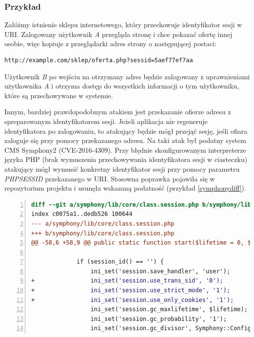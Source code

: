 \documentclass[11pt,a4paper,polish,thesis,oneside]{dcsbook}
\begin{document}
\subsubsection*{Przykład}
Załóżmy istnienie sklepu internetowego, który przechowuje identyfikator sesji w URI. Zalogowany użytkownik \textit{A} przegląda stronę i chce pokazać ofertę innej osobie, więc kopiuje z przeglądarki adres strony o następującej postaci:
\begin{lstlisting}
http://example.com/sklep/oferta.php?sessid=5aef77ef7aa
\end{lstlisting}
Użytkownik \textit{B} po wejściu na otrzymany adres będzie zalogowany z uprawnieniami użytkownika \textit{A} i otrzyma dostęp do wszystkich informacji o tym użytkowniku, które są przechowywane w systemie.

Innym, bardziej prawdopodobnym atakiem jest przekazanie ofierze adresu z spreparowanym identyfikatorem sesji. Jeżeli aplikacja nie regeneruje identyfikatora po zalogowaniu, to atakujący będzie mógł przejąć sesję, jeśli ofiara zaloguje się przy pomocy przekazanego adresu. Na taki atak był podatny system CMS Symphony2 (CVE-2016-4309). Przy błędnie skonfigurowanym interpreterze języka PHP (brak wymuszenia przechowywania identyfikatora sesji w ciasteczku) atakujący mógł wymusić konkretny identyfikator sesji przy pomocy parametru \textit{PHPSESSID} przekazanego w URI. Stosowna poprawka pojawiła się w repozytorium projektu i usunęła wskazaną podatność (przykład \ref{symphonydiff}).

\begin{lstlisting}[language=diff,frame=single,caption=łatka naprawiająca podatność fiksacji sesji w Symphony2 \cite{symphony},label=symphonydiff,numbers=left]
diff --git a/symphony/lib/core/class.session.php b/symphony/lib/core/class.session.php
index c0075a1..dedb526 100644
--- a/symphony/lib/core/class.session.php
+++ b/symphony/lib/core/class.session.php
@@ -58,6 +58,9 @@ public static function start($lifetime = 0, $path = '/', $domain = null, $httpOn
 
             if (session_id() == '') {
                 ini_set('session.save_handler', 'user');
+                ini_set('session.use_trans_sid', '0');
+                ini_set('session.use_strict_mode', '1');
+                ini_set('session.use_only_cookies', '1');
                 ini_set('session.gc_maxlifetime', $lifetime);
                 ini_set('session.gc_probability', '1');
                 ini_set('session.gc_divisor', Symphony::Configuration()->get('session_gc_divisor', 'symphony'));
\end{lstlisting}
\end{document}
